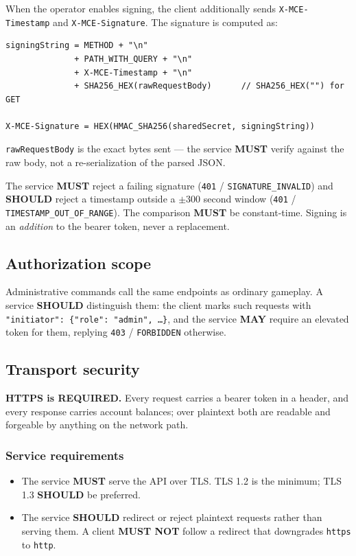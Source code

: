 \documentclass[11pt,a4paper]{article}
\newcommand{\code}[1]{\texttt{\small #1}}
\newcommand{\req}{\textbf{MUST}}
\newcommand{\rec}{\textbf{SHOULD}}
\newcommand{\opt}{\textbf{MAY}}
\newcommand{\keybox}[2]{%
  \par\vspace{0.5em}\noindent
  \colorbox{#1}{%
    \begin{minipage}{\dimexpr\linewidth-2\fboxsep\relax}
    \vspace{0.35em}\small #2\vspace{0.35em}
    \end{minipage}}%
  \par\vspace{0.5em}}
\newcommand{\warn}[1]{\keybox{omceWarnWash}{#1}}
\begin{document}
When the operator enables signing, the client additionally sends \code{X-MCE-Timestamp} and
\code{X-MCE-Signature}. The signature is computed as:

\begin{lstlisting}[style=http]
signingString = METHOD + "\n"
              + PATH_WITH_QUERY + "\n"
              + X-MCE-Timestamp + "\n"
              + SHA256_HEX(rawRequestBody)      // SHA256_HEX("") for GET

X-MCE-Signature = HEX(HMAC_SHA256(sharedSecret, signingString))
\end{lstlisting}

\code{rawRequestBody} is the exact bytes sent --- the service \req{} verify against the raw body,
not a re-serialization of the parsed JSON.

The service \req{} reject a failing signature (\code{401} / \code{SIGNATURE\_INVALID}) and \rec{}
reject a timestamp outside a $\pm$300 second window (\code{401} /
\code{TIMESTAMP\_OUT\_OF\_RANGE}). The comparison \req{} be constant-time. Signing is an
\emph{addition} to the bearer token, never a replacement.

\subsection{Authorization scope}

Administrative commands call the same endpoints as ordinary gameplay. A service \rec{} distinguish
them: the client marks such requests with \code{"initiator": \{"role": "admin", \ldots\}}, and the
service \opt{} require an elevated token for them, replying \code{403} / \code{FORBIDDEN}
otherwise.

\subsection{Transport security}
\label{sec:tls}

\warn{\textbf{HTTPS is REQUIRED.} Every request carries a bearer token in a header, and every
response carries account balances; over plaintext both are readable and forgeable by anything on
the network path.}

\subsubsection*{Service requirements}
\begin{itemize}
\item The service \req{} serve the API over TLS. TLS 1.2 is the minimum; TLS 1.3 \rec{} be
      preferred.
\item The service \rec{} redirect or reject plaintext requests rather than serving them. A client
      \textbf{MUST NOT} follow a redirect that downgrades \code{https} to \code{http}.
\end{itemize}
\end{document}
